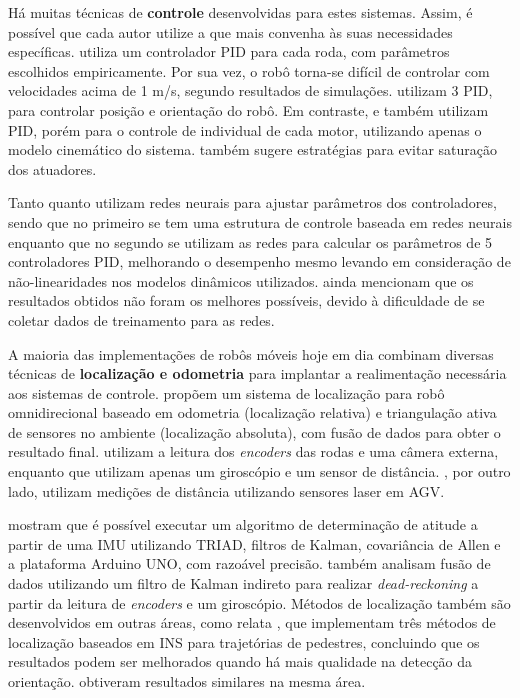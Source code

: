 Há muitas técnicas de \textbf{controle} desenvolvidas para estes sistemas. Assim, é possível que cada autor utilize a que mais convenha às suas necessidades específicas. \cite{ritter2016modelagem} utiliza um controlador PID para cada roda, com parâmetros escolhidos empiricamente. Por sua vez, o robô torna-se difícil de controlar com velocidades acima de 1 m/s, segundo resultados de simulações. \cite{samani2007comprehensive} utilizam 3 PID, para controlar posição e orientação do robô. Em contraste, \cite{rojas2006holonomic} e \cite{indiveri2009swedish} também utilizam PID, porém para o controle de individual de cada motor, utilizando apenas o modelo cinemático do sistema. \cite{indiveri2009swedish} também sugere estratégias para evitar saturação dos atuadores.

Tanto \cite{treesatayapun2011discrete} quanto \cite{oubbati2005velocity} utilizam redes neurais para ajustar parâmetros dos controladores, sendo que no primeiro se tem uma estrutura de controle baseada em redes neurais enquanto que no segundo se utilizam as redes para calcular os parâmetros de 5 controladores PID, melhorando o desempenho mesmo levando em consideração de não-linearidades nos modelos dinâmicos utilizados. \cite{oubbati2005velocity} ainda mencionam que os resultados obtidos não foram os melhores possíveis, devido à dificuldade de se coletar dados de treinamento para as redes.

A maioria das implementações de robôs móveis hoje em dia combinam diversas técnicas de \textbf{localização e odometria} para implantar a realimentação necessária aos sistemas de controle. \cite{ginzburg2013indoor} propõem um sistema de localização para robô omnidirecional baseado em odometria (localização relativa) e triangulação ativa de sensores no ambiente (localização absoluta), com fusão de dados para obter o resultado final. \cite{rojas2006holonomic} utilizam a leitura dos \emph{encoders} das rodas e uma câmera externa, enquanto que \cite{garcia2015gyro} utilizam apenas um giroscópio e um sensor de distância. \cite{rohrig2010laser}, por outro lado, utilizam medições de distância utilizando sensores laser em AGV.

\cite{lowcostIMU} mostram que é possível executar um algoritmo de determinação de atitude a partir de uma IMU utilizando TRIAD, filtros de Kalman, covariância de Allen e a plataforma Arduino UNO, com razoável precisão. \cite{park1996dead} também analisam fusão de dados utilizando um filtro de Kalman indireto para realizar \emph{dead-reckoning} a partir da leitura de \emph{encoders} e um giroscópio. Métodos de localização também são desenvolvidos em outras áreas, como relata \cite{jimenez2009comparison}, que implementam três métodos de localização baseados em INS para trajetórias de pedestres, concluindo que os resultados podem ser melhorados quando há mais qualidade na detecção da orientação. \cite{steinhoff2010pocket} obtiveram resultados similares na mesma área.

